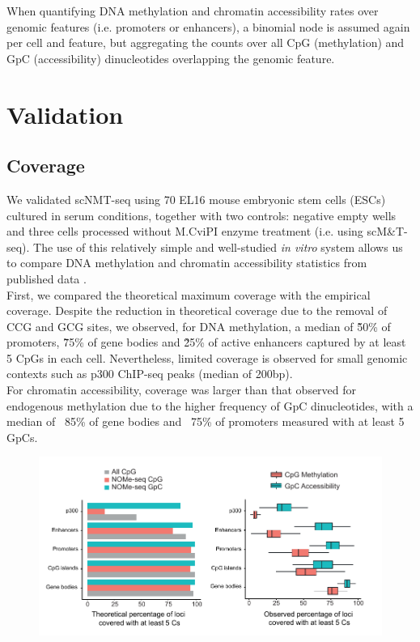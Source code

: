 When quantifying DNA methylation and chromatin accessibility rates over genomic features (i.e. promoters or enhancers), a binomial node is assumed again per cell and feature, but aggregating the counts over all CpG (methylation) and GpC (accessibility) dinucleotides overlapping the genomic feature.

\section{Validation}

\subsection{Coverage}
We validated scNMT-seq using 70 EL16 mouse embryonic stem cells (ESCs) cultured in serum conditions, together with two controls: negative empty wells and three cells processed without M.CviPI enzyme treatment (i.e. using scM\&T-seq). The use of this relatively simple and well-studied \textit{in vitro} system allows us to compare DNA methylation and chromatin accessibility statistics from published data \cite{Smallwood2014,Angermueller2016,Ficz2013}.\\

First, we compared the theoretical maximum coverage with the empirical coverage. Despite the reduction in theoretical coverage due to the removal of CCG and GCG sites, we observed, for DNA methylation, a median of \~50\% of promoters, \~75\% of gene bodies and \~25\% of active enhancers captured by at least 5 CpGs in each cell. Nevertheless, limited coverage is observed for small genomic contexts such as p300 ChIP-seq peaks (median of 200bp).\\
For chromatin accessibility, coverage was larger than that observed for endogenous methylation due to the higher frequency of GpC dinucleotides, with a median of ~85\% of gene bodies and ~75\% of promoters measured with at least 5 GpCs.

\begin{figure}[H]
	\centering
	\includegraphics[width=1.0\linewidth]{scNMT_coverage}
	\caption[]{}
	\label{fig:scnmt_coverage}
\end{figure}

